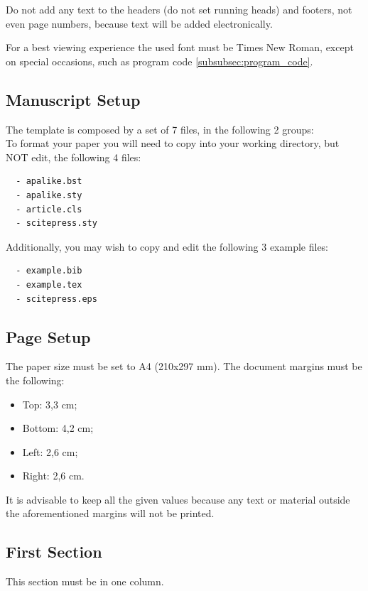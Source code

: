 \documentclass[a4paper,twoside]{article}
\begin{document}
Do not add any text to the headers (do not set running heads) and footers, not even page numbers, because text will be added electronically.

For a best viewing experience the used font must be Times New Roman, except on special occasions, such as program code
\ref{subsubsec:program_code}.


\subsection{Manuscript Setup}

The template is composed by a set of 7 files, in the following 2 groups:\\
 To format your paper you will need to copy into your working directory, but NOT edit, the following 4 files:
\begin{verbatim}
  - apalike.bst
  - apalike.sty
  - article.cls
  - scitepress.sty
\end{verbatim}

 Additionally, you may wish to copy and edit the following 3 example files:
\begin{verbatim}
  - example.bib
  - example.tex
  - scitepress.eps
\end{verbatim}


\subsection{Page Setup}

The paper size must be set to A4 (210x297 mm). The document margins must be the following:

\begin{itemize}
    \item Top: 3,3 cm;
    \item Bottom: 4,2 cm;
    \item Left: 2,6 cm;
    \item Right: 2,6 cm.
\end{itemize}

It is advisable to keep all the given values because any text or material outside the aforementioned margins will not be printed.


\subsection{First Section}

This section must be in one column.
\end{document}
